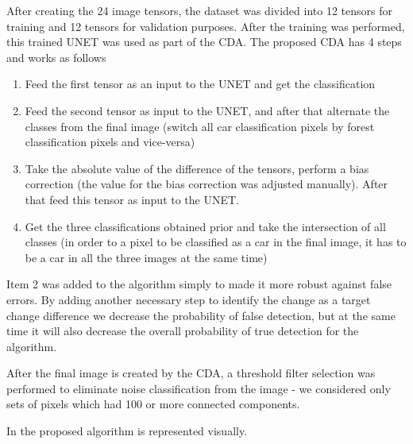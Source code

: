 After creating the 24 image tensors, the dataset was divided into 12 tensors for training and 12 tensors for validation purposes. After the training was performed, this trained UNET was used as part of the CDA. The proposed CDA has 4 steps and works as follows
\begin{enumerate}
    \item Feed the first tensor as an input to the UNET and get the classification
    \item Feed the second tensor as input to the UNET, and after that alternate the classes from the final image (switch all car classification pixels by forest classification pixels and vice-versa)
    \item Take the absolute value of the difference of the tensors, perform a bias correction (the value for the bias correction was adjusted manually). After that feed this tensor as input to the UNET.
    \item Get the three classifications obtained prior and take the intersection of all classes (in order to a pixel to be classified as a car in the final image, it has to be a car in all the three images at the same time)
\end{enumerate}

Item 2 was added to the algorithm simply to made it more robust against false errors. By adding another necessary step to identify the change as a target change difference
we decrease the probability of false detection, but at the same time it will also decrease the overall probability of true detection for the algorithm. 

After the final image is created by the CDA, a threshold filter selection was performed to eliminate noise classification from the image - we considered only sets of pixels which had 100 or more connected components.

In  the proposed algorithm is represented visually.

